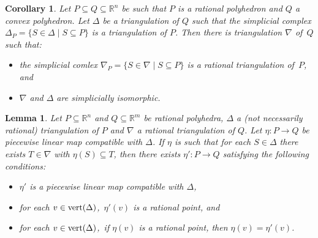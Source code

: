 \documentclass[reqno, draft]{amsart}
\newtheorem{lemma}[theorem]{Lemma}
\newtheorem{corollary}[theorem]{Corollary}
\theoremstyle{definition}
\begin{document}
\begin{corollary}\label{cor:Beynon} 
Let $P\subseteq Q\subseteq{\mathbb{R}}^n$ be such that 
$P$ is a rational polyhedron and $Q$ a convex polyhedron. 
Let $\Delta$ be a triangulation of $Q$ 
such that the simplicial complex 
$\Delta_{P}=\{S\in\Delta\mid S\subseteq P\}$ 
is a triangulation of $P$. 
Then there is triangulation $\nabla$ of~$Q$ such that:
\begin{itemize}
  \item[(i)] the simplicial comlex $\nabla_P=\{S\in\nabla\mid S\subseteq P\}$ 
     is a rational triangulation of~$P$, and
  \item[(ii)] $\nabla$ and $\Delta$ are simplicially isomorphic.
\end{itemize}
\end{corollary}

\begin{lemma}\label{Lem:RationalizationOfMap}
Let $P\subseteq{\mathbb{R}}^n$  and $Q\subseteq {\mathbb{R}}^m$ 
be rational polyhedra, 
$\Delta$ a {\rm (}not necessarily rational{\rm )} triangulation of $P$ 
and $\nabla$ a rational triangulation of $Q$. 
Let $\eta\colon P \to Q$ be piecewise linear map 
compatible with $\Delta$.   
If $\eta$ is such that for each $S\in\Delta$
there exists $T\in\nabla$ with $\eta(S)\subseteq T$, 
then there exists $\eta'\colon P\to Q$ satisfying the following conditions:
\begin{itemize}
  \item[(i)]  $\eta'$ is a piecewise linear map 
     compatible with $\Delta$,
  \item[(ii)] for each $v\in\operatorname{{\rm vert}}(\Delta)$,\ 
     $\eta'(v)$ is a rational point, and
\item[(iii)] for each $v\in\operatorname{{\rm vert}}(\Delta)$,\
      if $\eta(v)$ is a rational point, then $\eta(v)=\eta'(v)$.
\end{itemize}
\end{lemma}
\end{document}
